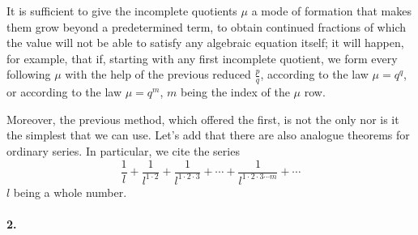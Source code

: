\documentclass{article}
\begin{document}
\begin{displayquote}
  It is sufficient to give the incomplete quotients $\mu$ a mode of formation
  that makes them grow beyond a predetermined term, to obtain continued
  fractions of which the value will not be able to satisfy any algebraic
  equation itself; it will happen, for example, that if, starting with any first
  incomplete quotient, we form every following $\mu$ with the help of the
  previous reduced $\frac{p}{q}$, according to the law $\mu = q^q$, or according
  to the law $\mu = q^m$, $m$  being the index of the $\mu$ row.

  Moreover, the previous method, which offered the first, is not the only nor
  is it the simplest that we can use. Let’s add that there are also analogue
  theorems for ordinary series. In particular, we cite the series
    $$\frac{1}{l} + \frac{1}{l^{1 \cdot 2}} + \frac{1}{l^{1\cdot 2\cdot 3}}
    + \cdots + \frac{1}{l^{1\cdot 2\cdot 3\cdots m}} + \cdots$$
  $l$ being a whole number.
\end{displayquote}

\paragraph{2.}
\end{document}
